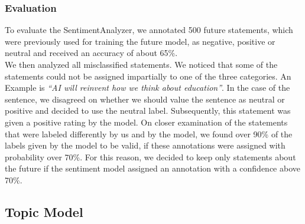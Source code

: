 \subsubsection{Evaluation}
To evaluate the SentimentAnalyzer, we annotated 500 future statements, which were previously used for training the future model, as negative, positive or neutral and received an accuracy of about 65\%.
\\
We then analyzed all misclassified statements.
We noticed that some of the statements could not be assigned impartially to one of the three categories.
An Example is \emph{``AI will reinvent how we think about education''}.
In the case of the sentence, we disagreed on whether we should value the sentence as neutral or positive and decided to use the neutral label.
Subsequently, this statement was given a positive rating by the model.
On closer examination of the statements that were labeled differently by us and by the model, we found over 90\% of the labels given by the model to be valid, if these annotations were assigned with probability over 70\%.
For this reason, we decided to keep only statements about the future if the sentiment model assigned an annotation with a confidence above 70\%.

\subsection{Topic Model}
\label{topic-model}

